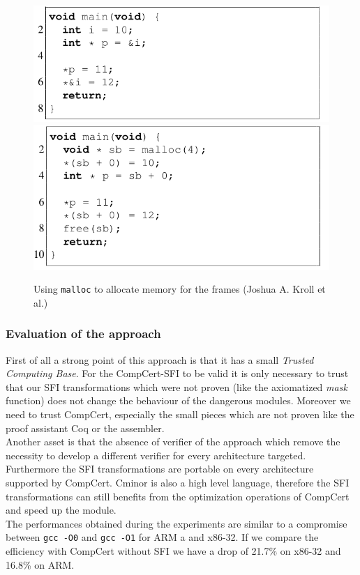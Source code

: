 \documentclass[11pt]{sdm}
\begin{document}
\begin{figure}[!ht]
\centering
\includegraphics[scale=0.33]{images/before_shadow.png}
\includegraphics[scale=0.33]{images/after_shadow.png}
\caption{Using \texttt{malloc} to allocate memory for the frames (Joshua A. Kroll et al.)}
\label{shadow_stack}
\end{figure}

\subsubsection{Evaluation of the approach}
\label{ssub:Evalutation of the approach}
First of all a strong point of this approach is that it has a small \textit{Trusted Computing Base}. For the CompCert-SFI to be valid it is only necessary to trust that our SFI transformations which were not proven (like the axiomatized \textit{mask} function) does not change the behaviour of the dangerous modules. Moreover we need to trust CompCert, especially the small pieces which are not proven like the proof assistant Coq or the assembler. \\
Another asset is that the absence of verifier of the approach which remove the necessity to develop a different verifier for every architecture targeted. Furthermore the SFI transformations are portable on every architecture supported by CompCert. Cminor is also a high level language, therefore the SFI transformations can still benefits from the optimization operations of CompCert and speed up the module. \\
The performances obtained during the experiments are similar to a compromise between \texttt{gcc -O0} and \texttt{gcc -O1} for ARM a and x86-32. If we compare the efficiency with CompCert without SFI we have a drop of 21.7\% on x86-32 and 16.8\% on ARM.
\end{document}
